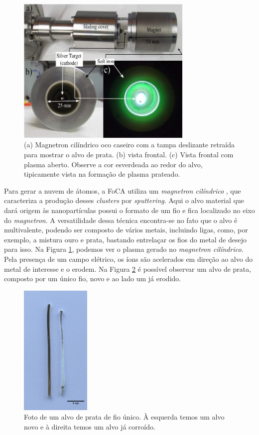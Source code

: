 \begin{figure}
  \centering
  \includegraphics[width=0.75\textwidth]{images/foca/magnetron_cil}
  \caption{ (a) Magnetron cilíndrico oco caseiro com a tampa deslizante retraída para mostrar o alvo de prata. (b) vista frontal. (c) Vista frontal com plasma aberto. Observe a cor esverdeada ao redor do alvo, tipicamente vista na formação de plasma prateado.\cite{livro_vitor} }
  \label{fig:magnetron}  
\end{figure}


Para gerar a nuvem de átomos, a FoCA utiliza um \textit{magnetron cilíndrico} \cite{ref_artigo_foca}, que caracteriza a produção desses \textit{clusters} por \textit{sputtering}. Aqui o alvo material que dará origem às nanopartículas possui o formato de um fio e fica localizado no eixo do \textit{magnetron}. A versatilidade dessa técnica encontra-se no fato que o alvo é multivalente, podendo ser composto de vários metais, incluindo ligas, como, por exemplo, a mistura ouro e prata, bastando entrelaçar os fios do metal de desejo para isso. Na Figura \ref{fig:magnetron}, podemos ver o plasma gerado no \textit{magnetron cilíndrico}. Pela presença de um campo elétrico, os íons são acelerados em direção ao alvo do metal de interesse e o erodem. Na Figura \ref{fig:alvo} é possível observar um alvo de prata, composto por um único fio, novo e ao lado um já erodido.





\begin{figure}
  \centering
  \includegraphics[width=0.3\textwidth]{images/foca/alvo}
  \caption{ Foto de um alvo de prata de fio único. À esquerda temos um alvo novo e à direita temos um alvo já corroído.  }
  \label{fig:alvo}
\end{figure}
